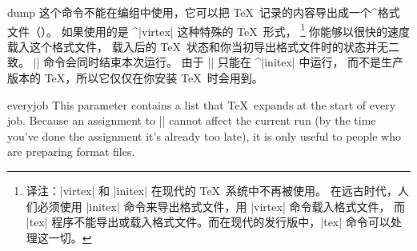 \begindesc
\cts dump {}
\explain
这个命令不能在编组中使用，它可以把 \TeX\ 记录的内容导出成一个^{格式文件}（）。
如果使用的是 ^|virtex| 这种特殊的 \TeX\ 形式，
\footnote{译注：|virtex| 和 |initex| 在现代的 \TeX\ 系统中不再被使用。
在远古时代，人们必须使用 |initex| 命令来导出格式文件，用 |virtex| 命令载入格式文件，
而 |tex| 程序不能导出或载入格式文件。而在现代的发行版中，|tex| 命令可以处理这一切。}
你能够以很快的速度载入这个格式文件，
载入后的 \TeX\ 状态和你当初导出格式文件时的状态并无二致。
|\dump| 命令会同时结束本次运行。
由于 |\dump| 只能在 ^|initex| 中运行，
而不是生产版本的 \TeX ，所以它仅仅在你安装 \TeX\ 时会用到。
\enddesc

\begindesc
\cts everyjob {}
\explain
This parameter contains a  list that \TeX\ expands at the
start of every job.  Because an assignment to |\everyjob| cannot affect
the current run (by the time you've done the assignment it's already too
late), it is only useful to people who are preparing format files.
\enddesc


\enddescriptions \endchapter \byebye
